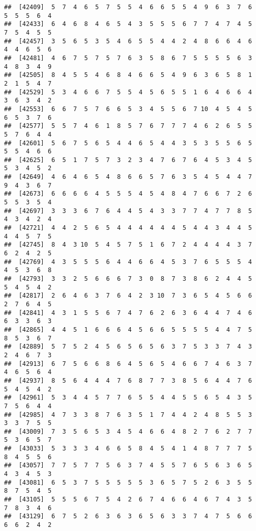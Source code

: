 \documentclass[
]{book}
\begin{document}
\begin{verbatim}
##  [42409]  5  7  4  6  5  7  5  5  4  6  6  5  5  4  9  6  3  7  6  5  5  5  6  4
##  [42433]  6  4  6  8  4  6  5  4  3  5  5  5  6  7  7  4  7  4  5  7  5  4  5  5
##  [42457]  3  5  6  5  3  5  4  6  5  5  4  4  2  4  8  6  6  4  6  4  4  6  5  6
##  [42481]  4  6  7  5  7  5  7  6  3  5  8  6  7  5  5  5  5  6  3  4  8  3  4  9
##  [42505]  8  4  5  5  4  6  8  4  6  6  5  4  9  6  3  6  5  8  1  2  1  5  4  7
##  [42529]  5  3  4  6  6  7  5  5  4  5  6  5  5  1  6  4  6  6  4  3  6  3  4  2
##  [42553]  6  6  7  5  7  6  6  5  3  4  5  5  6  7 10  4  5  4  5  6  5  3  7  6
##  [42577]  5  5  7  4  6  1  8  5  7  6  7  7  7  4  6  2  6  5  5  5  7  6  4  4
##  [42601]  5  6  7  5  6  5  4  4  6  5  4  4  3  5  3  5  5  6  5  5  5  4  6  6
##  [42625]  6  5  1  7  5  7  3  2  3  4  7  6  7  6  4  5  3  4  5  5  3  4  5  2
##  [42649]  4  6  4  6  5  4  8  6  6  5  7  6  3  5  4  5  4  4  7  9  4  3  6  7
##  [42673]  6  6  6  6  4  5  5  5  4  5  4  8  4  7  6  6  7  2  6  5  5  3  5  4
##  [42697]  3  3  3  6  7  6  4  4  5  4  3  3  7  7  4  7  7  8  5  4  3  4  2  4
##  [42721]  4  4  2  5  6  5  4  4  4  4  4  4  5  4  4  3  4  4  5  4  4  5  7  5
##  [42745]  8  4  3 10  5  4  5  7  5  1  6  7  2  4  4  4  4  3  7  6  2  4  2  5
##  [42769]  4  3  5  5  5  6  4  4  6  6  4  5  3  7  6  5  5  5  4  4  5  3  6  8
##  [42793]  3  3  2  5  6  6  6  7  3  0  8  7  3  8  6  2  4  4  5  5  4  5  4  2
##  [42817]  2  6  4  6  3  7  6  4  2  3 10  7  3  6  5  4  5  6  6  2  7  6  4  5
##  [42841]  4  3  1  5  5  6  7  4  7  6  2  6  3  6  4  4  7  4  6  6  3  3  6  3
##  [42865]  4  4  5  1  6  6  6  4  5  6  6  5  5  5  5  4  4  7  5  8  5  3  6  7
##  [42889]  5  7  5  2  4  5  6  5  6  5  6  3  7  5  3  3  7  4  3  2  4  6  7  3
##  [42913]  6  7  5  6  6  8  6  4  5  6  5  4  6  6  7  4  6  3  7  4  6  5  6  4
##  [42937]  8  5  6  4  4  4  7  6  8  7  7  3  8  5  6  4  4  7  6  5  4  5  4  2
##  [42961]  5  3  4  4  5  7  7  6  5  5  4  4  5  5  6  5  4  3  5  7  5  6  4  4
##  [42985]  4  7  3  3  8  7  6  3  5  1  7  4  4  2  4  8  5  5  3  3  3  7  5  5
##  [43009]  7  3  5  6  5  3  4  5  4  6  6  4  8  2  7  6  2  7  7  5  3  6  5  7
##  [43033]  5  3  3  3  4  6  6  5  8  4  5  4  1  4  8  7  7  7  5  8  4  5  5  6
##  [43057]  7  7  5  7  7  5  6  3  7  4  5  5  7  6  5  6  3  6  5  4  3  4  5  3
##  [43081]  6  5  3  7  5  5  5  5  5  3  6  5  7  5  2  6  3  5  5  8  7  5  4  5
##  [43105]  5  5  5  6  7  5  4  2  6  7  4  6  6  4  6  7  4  3  5  7  8  3  4  6
##  [43129]  6  7  5  2  6  3  6  3  6  5  6  3  3  7  4  7  5  6  6  6  6  2  4  2

\end{verbatim}
\end{document}
